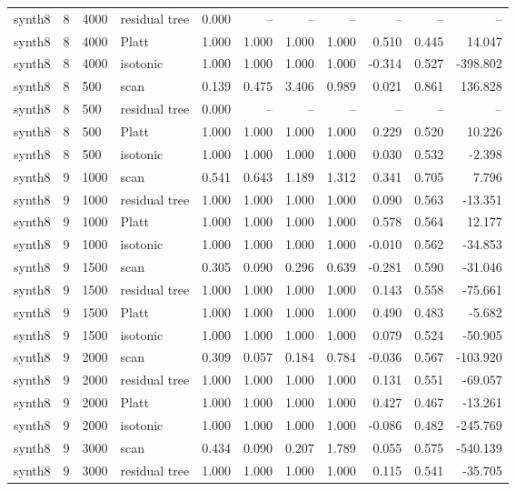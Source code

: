 \begin{tabular}{lrllrrrrrrr}
synth8 & 8 & 4000 & residual tree & 0.000 & -- & -- & -- & -- & -- & -- \\
synth8 & 8 & 4000 & Platt & 1.000 & 1.000 & 1.000 & 1.000 & 0.510 & 0.445 & 14.047 \\
synth8 & 8 & 4000 & isotonic & 1.000 & 1.000 & 1.000 & 1.000 & -0.314 & 0.527 & -398.802 \\
synth8 & 8 & 500 & scan & 0.139 & 0.475 & 3.406 & 0.989 & 0.021 & 0.861 & 136.828 \\
synth8 & 8 & 500 & residual tree & 0.000 & -- & -- & -- & -- & -- & -- \\
synth8 & 8 & 500 & Platt & 1.000 & 1.000 & 1.000 & 1.000 & 0.229 & 0.520 & 10.226 \\
synth8 & 8 & 500 & isotonic & 1.000 & 1.000 & 1.000 & 1.000 & 0.030 & 0.532 & -2.398 \\
synth8 & 9 & 1000 & scan & 0.541 & 0.643 & 1.189 & 1.312 & 0.341 & 0.705 & 7.796 \\
synth8 & 9 & 1000 & residual tree & 1.000 & 1.000 & 1.000 & 1.000 & 0.090 & 0.563 & -13.351 \\
synth8 & 9 & 1000 & Platt & 1.000 & 1.000 & 1.000 & 1.000 & 0.578 & 0.564 & 12.177 \\
synth8 & 9 & 1000 & isotonic & 1.000 & 1.000 & 1.000 & 1.000 & -0.010 & 0.562 & -34.853 \\
synth8 & 9 & 1500 & scan & 0.305 & 0.090 & 0.296 & 0.639 & -0.281 & 0.590 & -31.046 \\
synth8 & 9 & 1500 & residual tree & 1.000 & 1.000 & 1.000 & 1.000 & 0.143 & 0.558 & -75.661 \\
synth8 & 9 & 1500 & Platt & 1.000 & 1.000 & 1.000 & 1.000 & 0.490 & 0.483 & -5.682 \\
synth8 & 9 & 1500 & isotonic & 1.000 & 1.000 & 1.000 & 1.000 & 0.079 & 0.524 & -50.905 \\
synth8 & 9 & 2000 & scan & 0.309 & 0.057 & 0.184 & 0.784 & -0.036 & 0.567 & -103.920 \\
synth8 & 9 & 2000 & residual tree & 1.000 & 1.000 & 1.000 & 1.000 & 0.131 & 0.551 & -69.057 \\
synth8 & 9 & 2000 & Platt & 1.000 & 1.000 & 1.000 & 1.000 & 0.427 & 0.467 & -13.261 \\
synth8 & 9 & 2000 & isotonic & 1.000 & 1.000 & 1.000 & 1.000 & -0.086 & 0.482 & -245.769 \\
synth8 & 9 & 3000 & scan & 0.434 & 0.090 & 0.207 & 1.789 & 0.055 & 0.575 & -540.139 \\
synth8 & 9 & 3000 & residual tree & 1.000 & 1.000 & 1.000 & 1.000 & 0.115 & 0.541 & -35.705 \\

\end{tabular}
